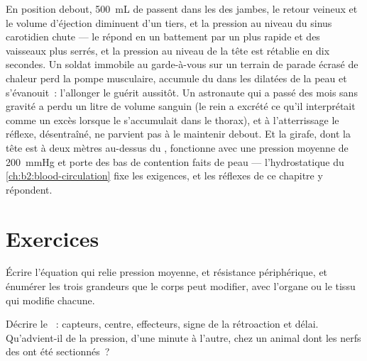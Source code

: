 \begin{example}\label{ex:b2:blood-pressure:standing}
En position debout, \qty{500}{mL} de  passent dans les  des
jambes, le retour veineux et le volume d'éjection diminuent d'un tiers,
et la pression au niveau du sinus carotidien chute --- le 
répond en un battement par un  plus rapide et des vaisseaux plus
serrés, et la pression au niveau de la tête est rétablie en dix secondes.
Un soldat immobile au garde-à-vous sur un terrain de parade écrasé de
chaleur perd la pompe musculaire, accumule du  dans les 
dilatées de la peau et s'évanouit~: l'allonger le guérit aussitôt. Un
astronaute qui a passé des mois sans gravité a perdu un litre de volume
sanguin (le rein a excrété ce qu'il interprétait comme un excès lorsque
le  s'accumulait dans le thorax), et à l'atterrissage le réflexe,
désentraîné, ne parvient pas à le maintenir debout. Et la girafe, dont la
tête est à deux mètres au-dessus du , fonctionne avec une pression
moyenne de \qty{200}{mmHg} et porte des bas de contention faits de peau
--- l'hydrostatique du \cref{ch:b2:blood-circulation} fixe les
exigences, et les réflexes de ce chapitre y répondent.
\end{example}

\section{Exercices}

\begin{exercise}[$\star$]\label{exo:b2:blood-pressure:1}
Écrire l'équation qui relie pression moyenne,  et
résistance périphérique, et énumérer les trois grandeurs que le corps
peut modifier, avec l'organe ou le tissu qui modifie chacune.
\end{exercise}

\begin{exercise}[$\star$]\label{exo:b2:blood-pressure:2}
Décrire le ~: capteurs, centre, effecteurs, signe de la
rétroaction et délai. Qu'advient-il de la pression, d'une minute à
l'autre, chez un animal dont les nerfs des  ont été
sectionnés~?
\end{exercise}

